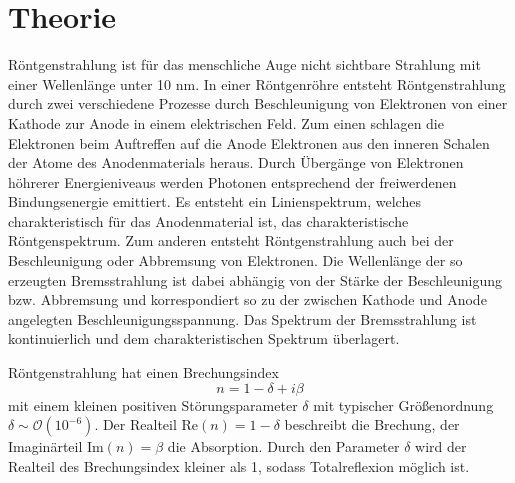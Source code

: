 \section{Theorie}
Röntgenstrahlung ist für das menschliche Auge nicht sichtbare Strahlung mit einer Wellenlänge unter 10 nm.
In einer Röntgenröhre entsteht Röntgenstrahlung durch zwei verschiedene Prozesse durch Beschleunigung von 
Elektronen von einer Kathode zur Anode in einem elektrischen Feld. Zum einen schlagen die Elektronen
beim Auftreffen auf die Anode Elektronen aus den inneren Schalen der Atome des Anodenmaterials heraus. 
Durch Übergänge von Elektronen höhrerer Energieniveaus werden Photonen entsprechend der 
freiwerdenen Bindungsenergie emittiert. Es entsteht ein Linienspektrum, welches charakteristisch für das 
Anodenmaterial ist, das charakteristische Röntgenspektrum. 
Zum anderen entsteht Röntgenstrahlung auch bei der Beschleunigung oder Abbremsung von Elektronen. Die 
Wellenlänge der so erzeugten Bremsstrahlung ist dabei abhängig von der Stärke der Beschleunigung bzw. 
Abbremsung und korrespondiert so zu der zwischen Kathode und Anode angelegten Beschleunigungsspannung.
Das Spektrum der Bremsstrahlung ist kontinuierlich und dem charakteristischen Spektrum überlagert.

Röntgenstrahlung hat einen Brechungsindex
\begin{equation*}
    n = 1 - \delta + i \beta
\end{equation*}
mit einem kleinen positiven Störungsparameter $\delta$ mit typischer Größenordnung 
$\delta \sim \mathcal{O}(10^{-6})$. Der Realteil $\text{Re}(n) = 1-\delta$ beschreibt die Brechung, der
Imaginärteil $\text{Im}(n) = \beta$ die Absorption. Durch den Parameter $\delta$ wird der Realteil des 
Brechungsindex kleiner als 1, sodass Totalreflexion möglich ist.